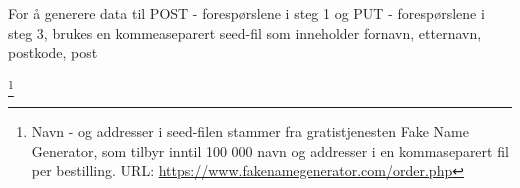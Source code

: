 For å generere data til POST - forespørslene i steg 1 og PUT - forespørslene i steg 3, brukes en kommea\-separert seed-fil som inneholder fornavn, etternavn, postkode, post

\footnote{Navn - og addresser i seed-filen stammer fra gratistjenesten Fake Name Generator, som tilbyr inntil 100 000 navn og addresser i en kommaseparert fil per bestilling. URL: \url{https://www.fakenamegenerator.com/order.php}}

